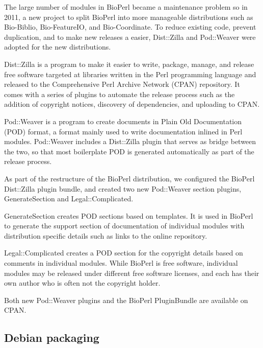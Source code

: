 The large number of modules in BioPerl became a maintenance problem
so in 2011, a new project to split BioPerl into
more manageable distributions such as Bio-Biblio, Bio-FeatureIO, and
Bio-Coordinate.  To reduce existing code, prevent duplication,
and to make new releases
a easier, Dist::Zilla and Pod::Weaver were adopted for
the new distributions.

Dist::Zilla is a program to make it easier to write, package, manage,
and release free software targeted at libraries written in the Perl
programming language and released to the Comprehensive Perl Archive
Network (CPAN) repository.  It comes with a series of plugins to automate the
release process such as the addition of copyright notices, discovery
of dependencies, and uploading to CPAN.

Pod::Weaver is a program to create documents in Plain Old
Documentation (POD) format, a format mainly used to write
documentation inlined in Perl modules.
Pod::Weaver includes a Dist::Zilla plugin
that serves as bridge between the two, so that most boilerplate POD is
generated automatically as part of the release process.

As part of the restructure of the BioPerl distribution, we configured
the BioPerl Dist::Zilla plugin bundle, and created two new Pod::Weaver
section plugins, GenerateSection and Legal::Complicated.

GenerateSection creates POD sections based on templates.  It is
used in BioPerl to generate the support section of documentation
of individual modules
with distribution specific details such as links to the online
repository.

Legal::Complicated creates a POD section for the copyright details
based on comments in individual modules.  While BioPerl is free
software, individual modules may be released under different free
software licenses, and each has their own author who is often not
the copyright holder.

Both new Pod::Weaver plugins and the BioPerl PluginBundle are available
on CPAN.

\subsection{Debian packaging}

